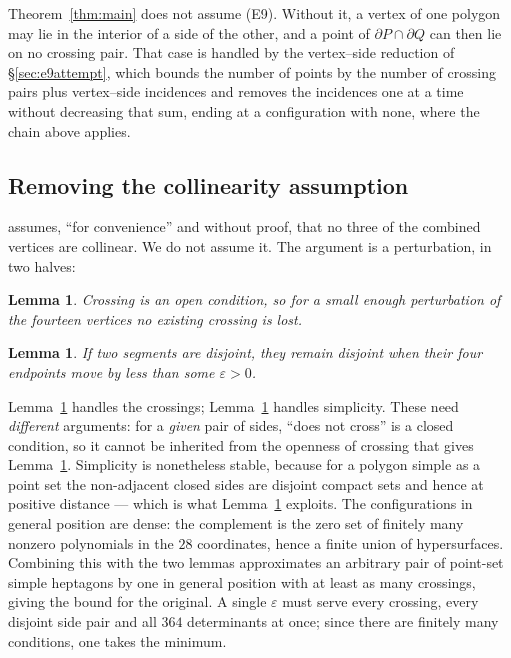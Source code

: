 \documentclass[11pt,a4paper]{article}
\theoremstyle{plain}
\newtheorem{lemma}[theorem]{Lemma}
\theoremstyle{definition}
\theoremstyle{remark}
\begin{document}
Theorem~\ref{thm:main} does not assume (E9). Without it, a vertex of one
polygon may lie in the interior of a side of the other, and a point of
$\partial P\cap\partial Q$ can then lie on no crossing pair. That case is
handled by the vertex--side reduction of \S\ref{sec:e9attempt}, which bounds
the number of points by the number of crossing pairs plus vertex--side
incidences and removes the incidences one at a time without decreasing that
sum, ending at a configuration with none, where the chain above applies.

\subsection{Removing the collinearity assumption}\label{sec:removecollin}

\cite[\S3]{AckermanKeszeghRote2022} assumes, ``for convenience'' and without proof, that no three
of the combined vertices are collinear. We do not assume it. The argument is a
perturbation, in two halves:

\begin{lemma}\label{lem:open}
Crossing is an open condition, so for a small enough perturbation of the
fourteen vertices no existing crossing is lost.
\end{lemma}

\begin{lemma}\label{lem:simple}
If two segments are disjoint, they remain disjoint when their four endpoints
move by less than some $\varepsilon>0$.
\end{lemma}

Lemma~\ref{lem:open} handles the crossings; Lemma~\ref{lem:simple} handles
simplicity. These need \emph{different} arguments: for a \emph{given} pair of
sides, ``does not cross'' is a closed condition, so it cannot be inherited from
the openness of crossing that gives Lemma~\ref{lem:open}. Simplicity is
nonetheless stable, because for a polygon simple as a point set the
non-adjacent closed sides are disjoint compact sets and hence at positive
distance --- which is what Lemma~\ref{lem:simple} exploits. The configurations in general position are dense: the complement is the zero
set of finitely many nonzero polynomials in the $28$ coordinates, hence a finite
union of hypersurfaces. Combining this with the two lemmas approximates an
arbitrary pair of point-set simple heptagons by one in general position with at
least as many crossings, giving the bound for the original. A single
$\varepsilon$ must serve every crossing, every disjoint side pair and all $364$
determinants at once; since there are finitely many conditions, one takes the
minimum.
\end{document}
